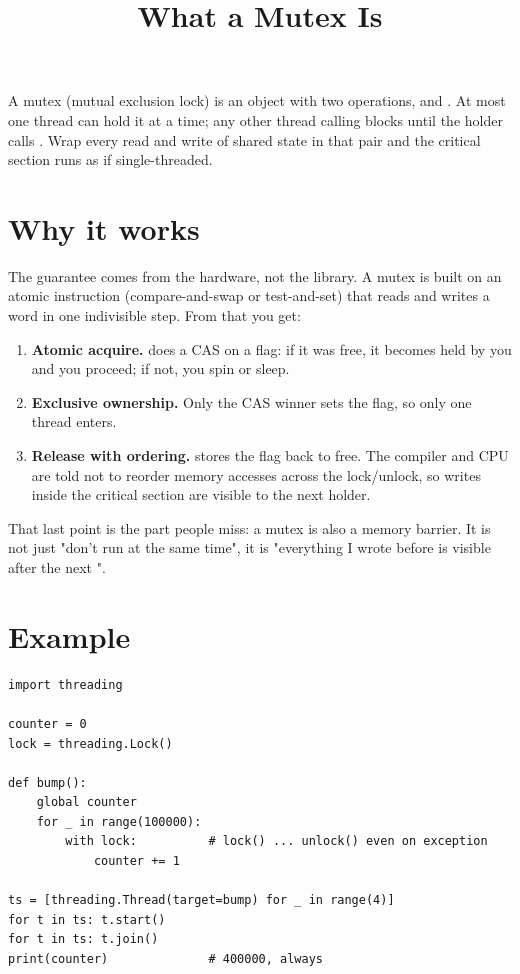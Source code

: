 \documentclass[11pt]{article}
\title{What a Mutex Is}
\author{}
\date{}
\begin{document}
\maketitle

A mutex (mutual exclusion lock) is an object with two operations,  and . At most one thread can hold it at a time; any other thread calling  blocks until the holder calls . Wrap every read and write of shared state in that pair and the critical section runs as if single-threaded.

\section{Why it works}

The guarantee comes from the hardware, not the library. A mutex is built on an atomic instruction (compare-and-swap or test-and-set) that reads and writes a word in one indivisible step. From that you get:

\begin{enumerate}[nosep]
  \item \textbf{Atomic acquire.}  does a CAS on a flag: if it was free, it becomes held by you and you proceed; if not, you spin or sleep.
  \item \textbf{Exclusive ownership.} Only the CAS winner sets the flag, so only one thread enters.
  \item \textbf{Release with ordering.}  stores the flag back to free. The compiler and CPU are told not to reorder memory accesses across the lock/unlock, so writes inside the critical section are visible to the next holder.
\end{enumerate}

That last point is the part people miss: a mutex is also a memory barrier. It is not just "don't run at the same time", it is "everything I wrote before  is visible after the next ".

\section{Example}

\begin{lstlisting}[style=py]
import threading

counter = 0
lock = threading.Lock()

def bump():
    global counter
    for _ in range(100000):
        with lock:          # lock() ... unlock() even on exception
            counter += 1

ts = [threading.Thread(target=bump) for _ in range(4)]
for t in ts: t.start()
for t in ts: t.join()
print(counter)              # 400000, always
\end{lstlisting}
\end{document}

